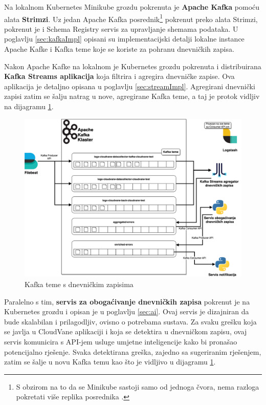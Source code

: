 \documentclass[times, utf8, diplomski]{fer}
\begin{document}
Na lokalnom Kubernetes Minikube grozdu pokrenuta je \textbf{Apache Kafka} pomoću alata \textbf{Strimzi}. Uz jedan Apache Kafka posrednik\footnote{S obzirom na to da se Minikube sastoji samo od jednoga čvora, nema razloga pokretati više replika posrednika .}  pokrenut preko alata Strimzi, pokrenut je i Schema Registry servis za upravljanje shemama podataka. U poglavlju \ref{sec:kafkaImpl} opisani su implementacijski detalji lokalne instance Apache Kafke i Kafka teme koje se koriste za pohranu dnevničkih zapisa.

Nakon Apache Kafke na lokalnom je Kubernetes grozdu pokrenuta i distribuirana \textbf{Kafka Streams aplikacija} koja filtrira i agregira dnevničke zapise. Ova aplikacija je detaljno opisana u poglavlju \ref{sec:streamImpl}. Agregirani dnevnički zapisi zatim se šalju natrag u nove, agregirane Kafka teme, a taj je protok vidljiv na dijagramu \ref{fig:topics}.

\begin{figure}[htb]
	\centering
	\includegraphics[width=15cm]{images/KafkaTopics.png}
	\caption[Kafka teme s dnevničkim zapisima]{Kafka teme  s dnevničkim zapisima }
	\label{fig:topics}
\end{figure}

Paralelno s tim, \textbf{servis za obogaćivanje dnevničkih zapisa} pokrenut je na Kubernetes grozdu i opisan je u poglavlju \ref{sec:ai}. Ovaj servis je dizajniran da bude skalabilan i prilagodljiv, ovisno o potrebama sustava. Za svaku grešku koja se javlja u CloudVane aplikaciji i koja se detektira u dnevničkom zapisu, ovaj servis komunicira s API-jem usluge umjetne inteligencije kako bi pronašao potencijalno rješenje. Svaka detektirana greška, zajedno sa sugeriranim rješenjem, zatim se šalje u novu Kafka temu kao što je vidljivo u dijagramu \ref{fig:topics}.
\end{document}
